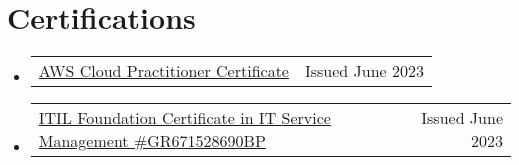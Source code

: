 \documentclass[letterpaper,11pt]{article}
\makeatletter
\newcommand{\resumeSubheadingCondensed}[2]{
  \item
    {\small \begin{tabular*}{0.97\textwidth}[t]{l@{\extracolsep{\fill}}r}
      #1 & #2 \\
    \end{tabular*}}\vspace{-7pt}
}
\newcommand{\resumeSubHeadingListStart}{\begin{itemize}[leftmargin=0.15in, label={}]}
\newcommand{\resumeItemListEnd}{\end{itemize}\vspace{-5pt}}
\makeatother
\begin{document}
\section{Certifications}
\resumeSubHeadingListStart
\resumeSubheadingCondensed
  {\href{https://www.credly.com/badges/a5febee5-016a-4ce3-a014-b824422519a3/public_url}{\textcolor{primary}{AWS Cloud Practitioner Certificate}}}{Issued June 2023}
  \resumeSubheadingCondensed
  {\href{https://www.peoplecert.org/for-corporations/certificate-verification-service}{\textcolor{primary}{ITIL Foundation Certificate in IT Service Management \#GR671528690BP}}}{Issued June 2023}

  \resumeItemListEnd


\end{document}
